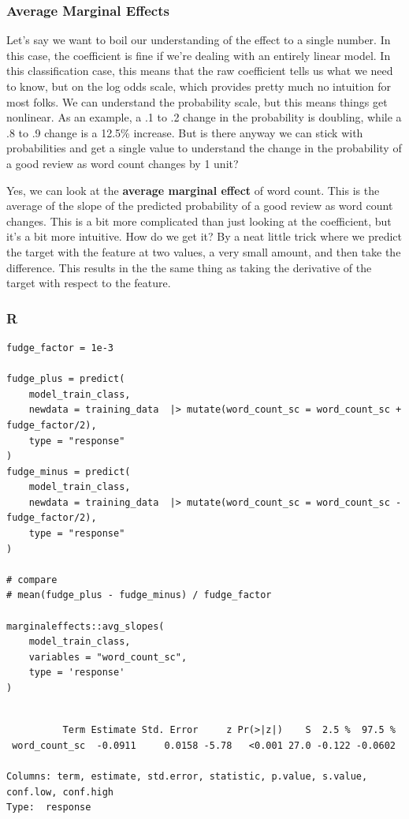 \documentclass[
  letterpaper,
]{krantz}
\begin{document}
\subsubsection{Average Marginal Effects}\label{average-marginal-effects}

Let's say we want to boil our understanding of the effect to a single
number. In this case, the coefficient is fine if we're dealing with an
entirely linear model. In this classification case, this means that the
raw coefficient tells us what we need to know, but on the log odds
scale, which provides pretty much no intuition for most folks. We can
understand the probability scale, but this means things get nonlinear.
As an example, a .1 to .2 change in the probability is doubling, while a
.8 to .9 change is a 12.5\% increase. But is there anyway we can stick
with probabilities and get a single value to understand the change in
the probability of a good review as word count changes by 1 unit?

Yes, we can look at the \textbf{average marginal effect} of word count.
This is the average of the slope of the predicted probability of a good
review as word count changes. This is a bit more complicated than just
looking at the coefficient, but it's a bit more intuitive. How do we get
it? By a neat little trick where we predict the target with the feature
at two values, a very small amount, and then take the difference. This
results in the the same thing as taking the derivative of the target
with respect to the feature.

\subsubsection{R}

\begin{verbatim}
fudge_factor = 1e-3

fudge_plus = predict(
    model_train_class, 
    newdata = training_data  |> mutate(word_count_sc = word_count_sc + fudge_factor/2),
    type = "response"
)
fudge_minus = predict(
    model_train_class, 
    newdata = training_data  |> mutate(word_count_sc = word_count_sc - fudge_factor/2),
    type = "response"
)

# compare
# mean(fudge_plus - fudge_minus) / fudge_factor

marginaleffects::avg_slopes(
    model_train_class, 
    variables = "word_count_sc", 
    type = 'response'
)
\end{verbatim}

\begin{verbatim}

          Term Estimate Std. Error     z Pr(>|z|)    S  2.5 %  97.5 %
 word_count_sc  -0.0911     0.0158 -5.78   <0.001 27.0 -0.122 -0.0602

Columns: term, estimate, std.error, statistic, p.value, s.value, conf.low, conf.high 
Type:  response 
\end{verbatim}
\end{document}
